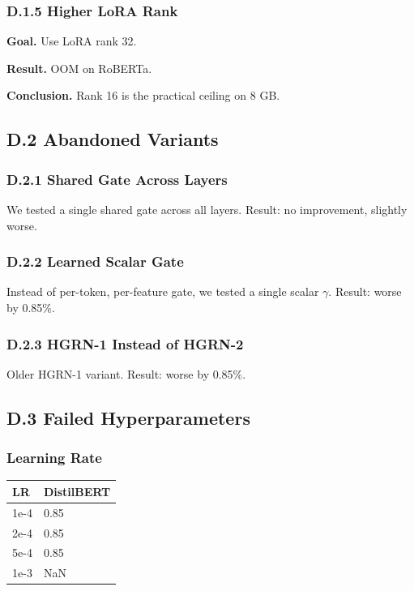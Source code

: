 \subsubsection{D.1.5 Higher LoRA Rank}

\textbf{Goal.} Use LoRA rank 32.

\textbf{Result.} OOM on RoBERTa.

\textbf{Conclusion.} Rank 16 is the practical ceiling on 8 GB.

\subsection{D.2 Abandoned Variants}

\subsubsection{D.2.1 Shared Gate Across Layers}

We tested a single shared gate across all layers. Result: no improvement, 
slightly worse.

\subsubsection{D.2.2 Learned Scalar Gate}

Instead of per-token, per-feature gate, we tested a single scalar $\gamma$. Result: 
worse by 0.85\%.

\subsubsection{D.2.3 HGRN-1 Instead of HGRN-2}

Older HGRN-1 variant. Result: worse by 0.85\%.

\subsection{D.3 Failed Hyperparameters}

\subsubsection{Learning Rate}

\begin{table}[H]
\centering
\small
\begin{tabular}{ll}
\toprule
\textbf{LR} & \textbf{DistilBERT} \\
\midrule
1e-4 & 0.85 \\
2e-4 & 0.85 \\
5e-4 & 0.85 \\
1e-3 & NaN \\
\bottomrule
\end{tabular}
\end{table}

